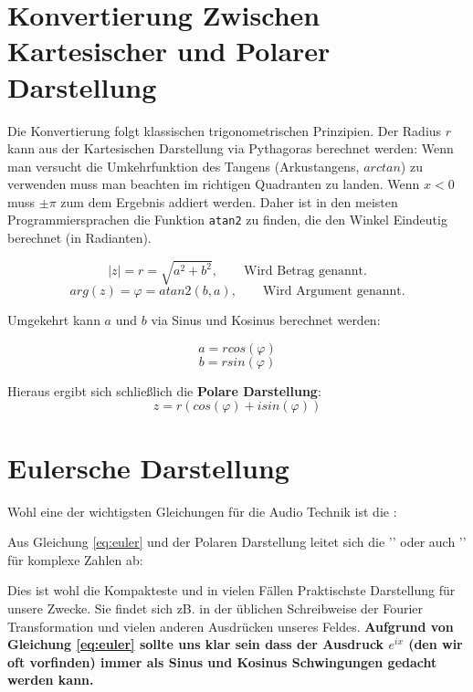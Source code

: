 \section{Konvertierung Zwischen Kartesischer und Polarer Darstellung}
Die Konvertierung folgt klassischen trigonometrischen Prinzipien.
Der Radius $r$ kann aus der Kartesischen Darstellung via Pythagoras berechnet werden:
Wenn man versucht die Umkehrfunktion des Tangens (Arkustangens, $arctan$) zu verwenden muss man beachten im richtigen Quadranten zu landen. Wenn $x<0$ muss $\pm \pi$ zum dem Ergebnis addiert werden. Daher ist in den meisten Programmiersprachen die Funktion \texttt{atan2} zu finden, die den Winkel Eindeutig berechnet (in Radianten). 

$$|z| = r = \sqrt{a^2 + b^2}, \qquad \text{Wird Betrag genannt.}$$
$$ arg(z) = \varphi = atan2(b,a), \qquad \text{Wird Argument genannt.} $$



Umgekehrt kann $a$ und $b$ via Sinus und Kosinus berechnet werden:

$$a = r cos(\varphi)$$
$$b = r sin(\varphi)$$

Hieraus ergibt sich schließlich die \textbf{Polare Darstellung}:
$$ z = r (cos(\varphi) + i sin(\varphi))$$




\section{Eulersche Darstellung}



Wohl eine der wichtigsten Gleichungen für die Audio Technik ist die :


Aus Gleichung \ref{eq:euler} und der Polaren Darstellung leitet sich die '' oder auch '' für komplexe Zahlen ab:


Dies ist wohl die Kompakteste und in vielen Fällen Praktischste Darstellung für unsere Zwecke. Sie findet sich zB. in der üblichen Schreibweise der Fourier Transformation und vielen anderen Ausdrücken unseres Feldes. \textbf{Aufgrund von Gleichung \ref{eq:euler} sollte uns klar sein dass der Ausdruck $e^{ix}$ (den wir oft vorfinden) immer als Sinus und Kosinus Schwingungen gedacht werden kann.}

